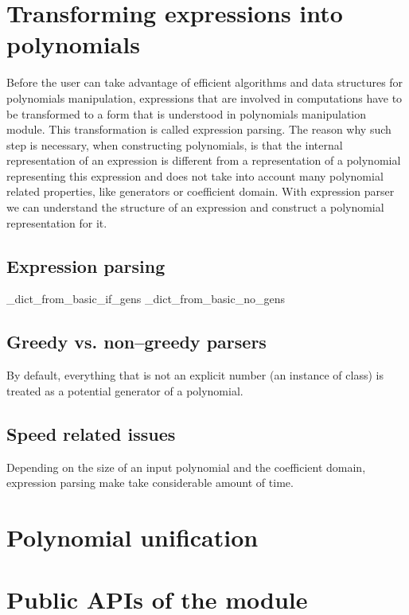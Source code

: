 \section{Transforming expressions into polynomials}

Before the user can take advantage of efficient algorithms and data structures for polynomials
manipulation, expressions that are involved in computations have to be transformed to a form
that is understood in polynomials manipulation module. This transformation is called expression
parsing. The reason why such step is necessary, when constructing polynomials, is that the
internal representation of an expression is different from a representation of a polynomial
representing this expression and does not take into account many polynomial related properties,
like generators or coefficient domain. With expression parser we can understand the structure
of an expression and construct a polynomial representation for it.


\subsection{Expression parsing}

\_dict\_from\_basic\_if\_gens
\_dict\_from\_basic\_no\_gens


\subsection{Greedy vs. non--greedy parsers}

By default, everything that is not an explicit number (an instance of  class) is
treated as a potential generator of a polynomial.


\subsection{Speed related issues}

Depending on the size of an input polynomial and the coefficient domain, expression parsing
make take considerable amount of time.


\section{Polynomial unification}


\section{Public APIs of the module}


